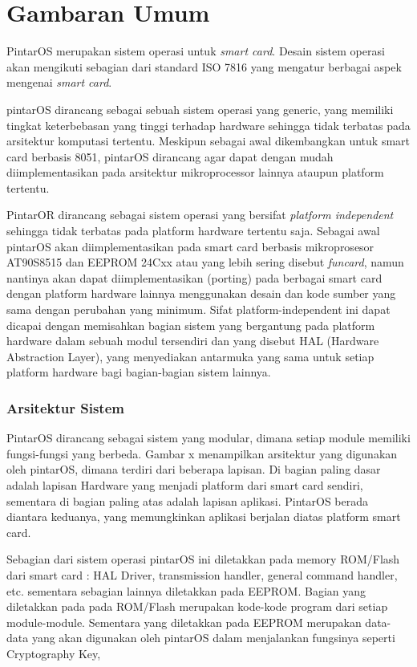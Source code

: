 \chapter{Gambaran Umum}
\label{chap_overall}

PintarOS merupakan sistem operasi untuk \emph{smart card}. Desain sistem operasi akan mengikuti sebagian dari standard ISO 7816 yang mengatur berbagai aspek mengenai \emph{smart card}.

pintarOS dirancang sebagai sebuah sistem operasi yang generic, yang memiliki tingkat keterbebasan yang tinggi terhadap hardware sehingga tidak terbatas pada arsitektur komputasi tertentu. Meskipun sebagai awal dikembangkan untuk smart card berbasis 8051, pintarOS dirancang agar dapat dengan mudah diimplementasikan pada arsitektur mikroprocessor lainnya ataupun platform tertentu. 

PintarOR dirancang sebagai sistem operasi yang bersifat \emph{platform independent} sehingga tidak terbatas pada platform hardware tertentu saja. Sebagai awal pintarOS akan diimplementasikan pada smart card berbasis mikroprosesor AT90S8515 dan EEPROM 24Cxx atau yang lebih sering disebut \emph{funcard}, namun nantinya akan dapat diimplementasikan (porting) pada berbagai smart card dengan platform hardware lainnya menggunakan desain dan kode sumber yang sama dengan perubahan yang minimum. Sifat platform-independent ini dapat dicapai dengan memisahkan bagian sistem yang bergantung pada platform hardware dalam sebuah modul tersendiri dan yang disebut HAL (Hardware Abstraction Layer), yang menyediakan antarmuka yang sama untuk setiap platform hardware bagi bagian-bagian sistem lainnya.

\subsection{Arsitektur Sistem}
\label{pintaros-arsitektur}

PintarOS dirancang sebagai sistem yang modular, dimana setiap module memiliki fungsi-fungsi yang berbeda. Gambar x menampilkan arsitektur yang digunakan oleh pintarOS, dimana terdiri dari beberapa lapisan. Di bagian paling dasar adalah lapisan Hardware yang menjadi platform dari smart card sendiri, sementara di bagian paling atas adalah lapisan aplikasi. PintarOS berada diantara keduanya, yang memungkinkan aplikasi berjalan diatas platform smart card.

Sebagian dari sistem operasi pintarOS ini diletakkan pada memory ROM/Flash dari smart card : HAL Driver, transmission handler, general command handler, etc. sementara sebagian lainnya diletakkan pada EEPROM. Bagian yang diletakkan pada pada ROM/Flash merupakan kode-kode program dari setiap module-module. Sementara yang diletakkan pada EEPROM merupakan data-data yang akan digunakan oleh pintarOS dalam menjalankan fungsinya seperti Cryptography Key, 

